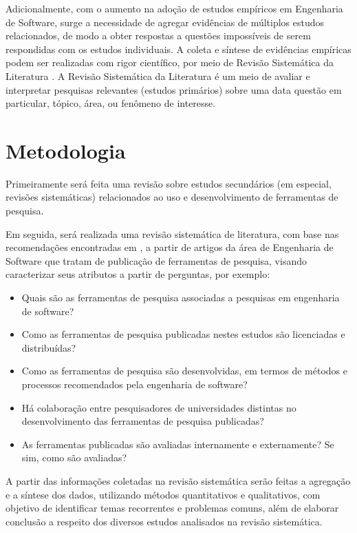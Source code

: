 \documentclass[12pt]{article}
\begin{document}
Adicionalmente, com o aumento na adoção de estudos empíricos em Engenharia de
Software, surge a necessidade de agregar evidências de múltiplos estudos
relacionados, de modo a obter respostas a questões impossíveis de serem
respondidas com os estudos individuais. A coleta e síntese de evidências
empíricas podem ser realizadas com rigor científico, por meio de Revisão
Sistemática da Literatura \cite{Kitchenham2007}. A Revisão Sistemática da
Literatura  é um meio de avaliar e interpretar pesquisas relevantes (estudos
primários) sobre uma data questão em particular, tópico, área, ou fenômeno de
interesse.

\section{Metodologia}

Primeiramente será feita uma revisão sobre estudos secundários (em especial,
revisões sistemáticas) relacionados ao uso e desenvolvimento de ferramentas de
pesquisa.
  
Em seguida, será realizada uma revisão sistemática de literatura, com base nas
recomendações encontradas em \cite{Kitchenham2007}, a partir
de artigos da área de Engenharia de Software que tratam de publicação de
ferramentas de pesquisa, visando caracterizar seus atributos a partir de
perguntas, por exemplo:

\begin{itemize}
  \item Quais são as ferramentas de pesquisa associadas a pesquisas em
    engenharia de software?
  \item Como as ferramentas de pesquisa publicadas nestes estudos são
    licenciadas e distribuídas?
  \item Como as ferramentas de pesquisa são desenvolvidas, em termos de
    métodos e processos recomendados pela engenharia de software?
  \item Há colaboração entre pesquisadores de universidades distintas no
    desenvolvimento das ferramentas de pesquisa publicadas?
  \item As ferramentas publicadas são avaliadas internamente e externamente?
    Se sim, como são avaliadas?
\end{itemize}

A partir das informações coletadas na revisão sistemática serão feitas a
agregação e a síntese dos dados, utilizando métodos quantitativos e
qualitativos, com objetivo de identificar temas recorrentes e problemas
comuns, além de elaborar conclusão a respeito dos diversos estudos analisados
na revisão sistemática.
\end{document}
